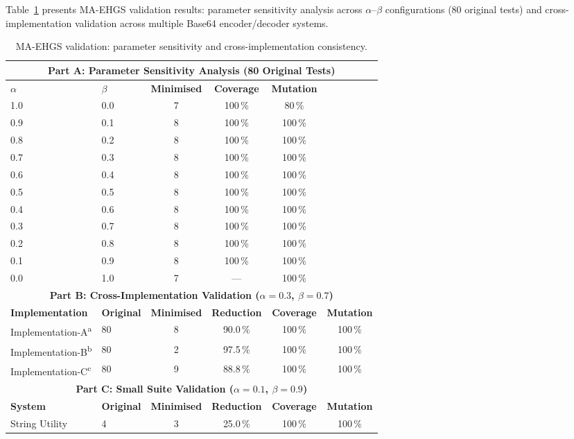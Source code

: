 \begin{appendices}
Table~\ref{tab:appendix-benchmarks} presents MA-EHGS validation results: parameter sensitivity analysis across $\alpha$--$\beta$ configurations (80 original tests) and cross-implementation validation across multiple Base64 encoder/decoder systems.

\begin{table}[H]
  \centering
  \caption{MA-EHGS validation: parameter sensitivity and cross-implementation consistency.}
  \label{tab:appendix-benchmarks}
  \begin{tabular}{@{}llcccc@{}}
    \toprule
    \multicolumn{6}{c}{\textbf{Part A: Parameter Sensitivity Analysis (80 Original Tests)}} \\
    \midrule
    $\alpha$ & $\beta$ & \textbf{Minimised} & \textbf{Coverage} & \textbf{Mutation} & \\
    \midrule
    1.0 & 0.0 & 7 & 100\,\% & 80\,\% & \\
    0.9 & 0.1 & 8 & 100\,\% & 100\,\% & \\
    0.8 & 0.2 & 8 & 100\,\% & 100\,\% & \\
    0.7 & 0.3 & 8 & 100\,\% & 100\,\% & \\
    0.6 & 0.4 & 8 & 100\,\% & 100\,\% & \\
    0.5 & 0.5 & 8 & 100\,\% & 100\,\% & \\
    0.4 & 0.6 & 8 & 100\,\% & 100\,\% & \\
    0.3 & 0.7 & 8 & 100\,\% & 100\,\% & \\
    0.2 & 0.8 & 8 & 100\,\% & 100\,\% & \\
    0.1 & 0.9 & 8 & 100\,\% & 100\,\% & \\
    0.0 & 1.0 & 7 & --- & 100\,\% & \\
    \midrule
    \multicolumn{6}{c}{\textbf{Part B: Cross-Implementation Validation ($\alpha = 0.3$, $\beta = 0.7$)}} \\
    \midrule
    \textbf{Implementation} & \textbf{Original} & \textbf{Minimised} & \textbf{Reduction} & \textbf{Coverage} & \textbf{Mutation} \\
    \midrule
    Implementation-A\textsuperscript{a} & 80 &  8 & 90.0\,\% & 100\,\% & 100\,\% \\
    Implementation-B\textsuperscript{b} & 80 &  2 & 97.5\,\% & 100\,\% & 100\,\% \\
    Implementation-C\textsuperscript{c} & 80 &  9 & 88.8\,\% & 100\,\% & 100\,\% \\
    \midrule
    \multicolumn{6}{c}{\textbf{Part C: Small Suite Validation ($\alpha = 0.1$, $\beta = 0.9$)}} \\
    \midrule
    \textbf{System} & \textbf{Original} & \textbf{Minimised} & \textbf{Reduction} & \textbf{Coverage} & \textbf{Mutation} \\
    \midrule
    String Utility & 4 &  3 & 25.0\,\% & 100\,\% & 100\,\% \\
    \bottomrule
  \end{tabular}
  \vspace{0.3em}
  

\end{table}
\end{appendices}
